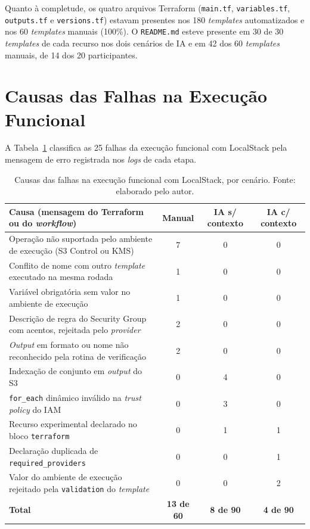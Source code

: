 Quanto à completude, os quatro arquivos Terraform (\texttt{main.tf}, \texttt{variables.tf}, \texttt{outputs.tf} e \texttt{versions.tf}) estavam presentes nos 180 \textit{templates} automatizados e nos 60 \textit{templates} manuais (100\%). O \texttt{README.md} esteve presente em 30 de 30 \textit{templates} de cada recurso nos dois cenários de IA e em 42 dos 60 \textit{templates} manuais, de 14 dos 20 participantes.

\section{Causas das Falhas na Execução Funcional}
\label{apx:localstack}

A Tabela~\ref{tab:localstack-causas} classifica as 25 falhas da execução funcional com LocalStack pela mensagem de erro registrada nos \textit{logs} de cada etapa.

\begin{table}[H]
\centering
\caption{Causas das falhas na execução funcional com LocalStack, por cenário. Fonte: elaborado pelo autor.}
\label{tab:localstack-causas}
\small
\begin{tabularx}{\textwidth}{>{\raggedright\arraybackslash}X|c|c|c}
\hline
\textbf{Causa (mensagem do Terraform ou do \textit{workflow})} & \textbf{Manual} & \textbf{IA s/ contexto} & \textbf{IA c/ contexto} \\
\hline
Operação não suportada pelo ambiente de execução (S3 Control ou KMS) & 7 & 0 & 0 \\
Conflito de nome com outro \textit{template} executado na mesma rodada & 1 & 0 & 0 \\
Variável obrigatória sem valor no ambiente de execução & 1 & 0 & 0 \\
Descrição de regra do Security Group com acentos, rejeitada pelo \textit{provider} & 2 & 0 & 0 \\
\textit{Output} em formato ou nome não reconhecido pela rotina de verificação & 2 & 0 & 0 \\
Indexação de conjunto em \textit{output} do S3 & 0 & 4 & 0 \\
\texttt{for\_each} dinâmico inválido na \textit{trust policy} do IAM & 0 & 3 & 0 \\
Recurso experimental declarado no bloco \texttt{terraform} & 0 & 1 & 1 \\
Declaração duplicada de \texttt{required\_providers} & 0 & 0 & 1 \\
Valor do ambiente de execução rejeitado pela \texttt{validation} do \textit{template} & 0 & 0 & 2 \\
\hline
\textbf{Total} & \textbf{13 de 60} & \textbf{8 de 90} & \textbf{4 de 90} \\
\hline
\end{tabularx}
\end{table}


